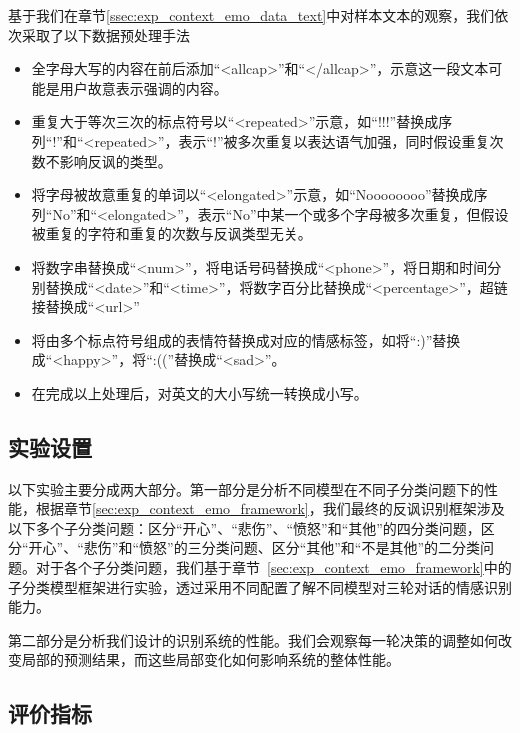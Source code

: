 基于我们在章节\ref{ssec:exp_context_emo_data_text}中对样本文本的观察，我们依次采取了以下数据预处理手法

\begin{itemize}

\item 全字母大写的内容在前后添加“<allcap>”和“</allcap>”，示意这一段文本可能是用户故意表示强调的内容。

\item 重复大于等次三次的标点符号以“<repeated>”示意，如“!!!”替换成序列“!”和“<repeated>”，表示“!”被多次重复以表达语气加强，同时假设重复次数不影响反讽的类型。

\item 将字母被故意重复的单词以“<elongated>”示意，如“Noooooooo”替换成序列“No”和“<elongated>”，表示“No”中某一个或多个字母被多次重复，但假设被重复的字符和重复的次数与反讽类型无关。

\item 将数字串替换成“<num>”，将电话号码替换成“<phone>”，将日期和时间分别替换成“<date>”和“<time>”，将数字百分比替换成“<percentage>”，超链接替换成“<url>”

\item 将由多个标点符号组成的表情符替换成对应的情感标签，如将“:)”替换成“<happy>”，将“:((”替换成“<sad>”。

\item 在完成以上处理后，对英文的大小写统一转换成小写。

\end{itemize}

\subsection{实验设置}

以下实验主要分成两大部分。第一部分是分析不同模型在不同子分类问题下的性能，根据章节\ref{sec:exp_context_emo_framework}，我们最终的反讽识别框架涉及以下多个子分类问题：区分“开心”、“悲伤”、“愤怒”和“其他”的四分类问题，区分“开心”、“悲伤”和“愤怒”的三分类问题、区分“其他”和“不是其他”的二分类问题。对于各个子分类问题，我们基于章节~\ref{sec:exp_context_emo_framework}中的子分类模型框架进行实验，透过采用不同配置了解不同模型对三轮对话的情感识别能力。

第二部分是分析我们设计的识别系统的性能。我们会观察每一轮决策的调整如何改变局部的预测结果，而这些局部变化如何影响系统的整体性能。

\subsection{评价指标}
\label{ssec:exp_context_emo_eval_metric}


